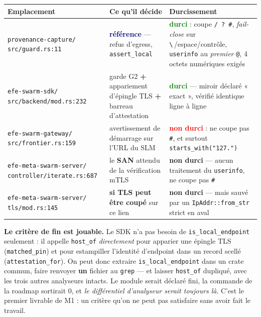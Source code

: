 \documentclass[10pt]{article}
\newcommand{\best}[1]{\textcolor{green}{\textbf{#1}}}
\newcommand{\pire}[1]{\textcolor{red}{\textbf{#1}}}
\newcommand{\code}[1]{\texttt{\small #1}}
\begin{document}
\begin{center}\footnotesize
\renewcommand{\arraystretch}{1.25}
\begin{tabular}{@{}>{\raggedright\arraybackslash}p{4.4cm} >{\raggedright\arraybackslash}p{4.3cm} >{\raggedright\arraybackslash}p{6.6cm}@{}}
\toprule
\textbf{Emplacement} & \textbf{Ce qu'il décide} & \textbf{Durcissement} \\
\midrule
\code{provenance-capture/} \code{src/guard.rs:11} &
\textcolor{navy}{\textbf{référence}} --- refus d'egress, \code{assert\_local} &
\best{durci} : coupe \code{/ ? \#}, \emph{fail-close} sur \code{\textbackslash}\,/espace/contrôle, \code{userinfo} au \emph{premier} \code{@}, 4 octets numériques exigés \\
\code{efe-swarm-sdk/} \code{src/backend/mod.rs:232} &
garde G2 \textbf{+} appariement d'épingle TLS \textbf{+} barreau d'attestation &
\best{durci} --- miroir déclaré « exact », vérifié identique ligne à ligne \\
\code{efe-swarm-gateway/} \code{src/frontier.rs:159} &
avertissement de démarrage sur l'URL du SLM &
\pire{non durci} : ne coupe pas \code{\#}, et surtout \code{starts\_with("127.")} \\
\code{efe-meta-swarm-server/} \code{controller/iterate.rs:687} &
le \textbf{SAN} attendu de la vérification mTLS &
\textcolor{amber}{\textbf{non durci}} --- aucun traitement du \code{userinfo}, ne coupe pas \code{\#} \\
\code{efe-meta-swarm-server/} \code{tls/mod.rs:145} &
\textbf{si TLS peut être coupé} sur ce lien &
\textcolor{amber}{\textbf{non durci}} --- mais sauvé par un \code{IpAddr::from\_str} strict en aval \\
\bottomrule
\end{tabular}
\end{center}

\begin{alerte}
\textbf{Le critère de fin est jouable.} Le SDK n'a pas besoin de \code{is\_local\_endpoint} seulement :
il appelle \code{host\_of} \emph{directement} pour apparier une épingle TLS
(\code{matched\_pin}) et pour estampiller l'identité d'endpoint dans un record scellé
(\code{attestation\_for}). On peut donc extraire \code{is\_local\_endpoint} dans un crate commun,
faire renvoyer \textbf{un} fichier au \code{grep} --- et laisser \code{host\_of} dupliqué, avec les
trois autres analyseurs intacts. Le module serait déclaré fini, la commande de la roadmap
sortirait 0, et \emph{le différentiel d'analyseur serait toujours là}. C'est le premier livrable de
M1 : un critère qu'on ne peut pas satisfaire sans avoir fait le travail.
\end{alerte}
\end{document}
